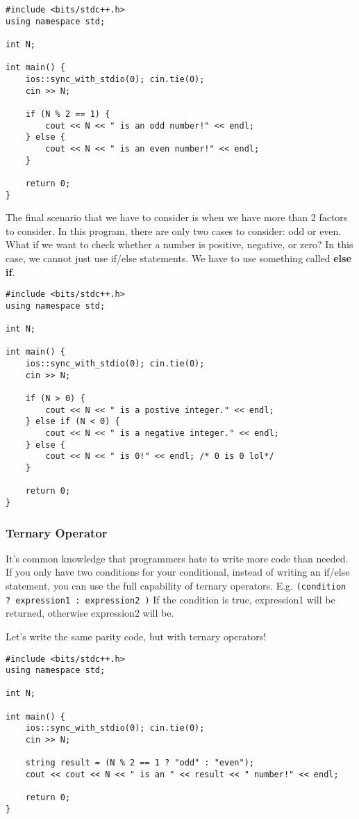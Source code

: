 \documentclass{report}
\begin{document}
\begin{lstlisting}[caption=Even/Odd]
#include <bits/stdc++.h>
using namespace std;

int N;

int main() {
    ios::sync_with_stdio(0); cin.tie(0);
    cin >> N;

    if (N % 2 == 1) {
        cout << N << " is an odd number!" << endl;
    } else {
        cout << N << " is an even number!" << endl;
    }

    return 0;
}
\end{lstlisting}

The final scenario that we have to consider is when we have more than 2 factors to consider. In this program, there are only two cases to consider: odd or even. What if we want to check whether a number is positive, negative, or zero? In this case, we cannot just use if/else statements. We have to use something called \textbf{else if}. 

\begin{lstlisting}[caption=Postive]
#include <bits/stdc++.h>
using namespace std;

int N;

int main() {
    ios::sync_with_stdio(0); cin.tie(0);
    cin >> N;

    if (N > 0) {
        cout << N << " is a postive integer." << endl;
    } else if (N < 0) {
        cout << N << " is a negative integer." << endl;
    } else {
        cout << N << " is 0!" << endl; /* 0 is 0 lol*/
    }

    return 0;
}
\end{lstlisting}

\subsubsection{Ternary Operator}
It's common knowledge that programmers hate to write more code than needed. If you only have two conditions for your conditional, instead of writing an if/else statement, you can use the full capability of ternary operators. E.g. \lstinline{(condition ? expression1 : expression2 )} If the condition is true, expression1 will be returned, otherwise expression2 will be.

Let's write the same parity code, but with ternary operators!

\begin{lstlisting}
#include <bits/stdc++.h>
using namespace std;

int N;

int main() {
    ios::sync_with_stdio(0); cin.tie(0);
    cin >> N;

    string result = (N % 2 == 1 ? "odd" : "even");
    cout << cout << N << " is an " << result << " number!" << endl;

    return 0;
}

\end{lstlisting}
\end{document}
